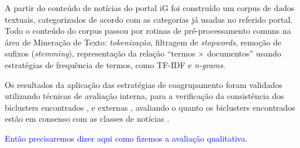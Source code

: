 \documentclass[
    12pt,                %
    oneside,            %
    a4paper,            %
    english,            %
    brazil                %
    ]{abntex2ppgsi}
\begin{document}
A partir do conteúdo de notícias do portal iG foi construído um corpus de dados textuais, categorizados de acordo com as categorias já usadas no referido portal.
Todo o conteúdo do corpus passou por rotinas de pré-processamento comuns na área de Mineração de Texto: \textit{tokenização}, filtragem de \textit{stopwords}, remoção de sufixos (\textit{stemming}), representação da relação ``termos $\times$ documentos'' usando estratégias de frequência de termos, como TF-IDF e \textit{n-grams}.


Os resultados da aplicação das estratégias de coagrupamento foram validados utilizando técnicas de avaliação interna, para a verificação da consistência dos biclusters encontrados \cite{Santamaria2007}, e externas \cite{Hochreiter2010}, avaliando o quanto os biclusters encontrados estão em consenso com as classes de notícias \cite{Hochreiter2010}.

\textcolor{blue}{Então precisaremos dizer aqui como fizemos a avaliação qualitativa.}


\end{document}
